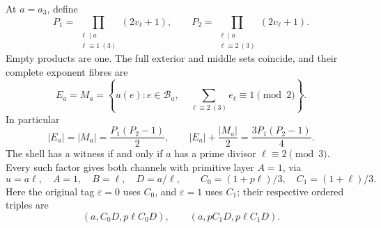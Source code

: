 \begin{theorem}
\label{thm:r3-factor-sieve}
At \(a=a_3\), define
\[
 P_1=\prod_{\substack{\ell\mid a\\\ell\equiv1\ (3)}}(2v_\ell+1),
 \qquad
 P_2=\prod_{\substack{\ell\mid a\\\ell\equiv2\ (3)}}(2v_\ell+1).
\]
Empty products are one. The full exterior and middle sets coincide,
and their complete exponent fibres are
\[
 E_a=M_a=
 \left\{u(e):e\in\mathcal B_a,\quad
           \sum_{\ell\equiv2\ (3)}e_\ell\equiv1\pmod2\right\}.
\]
In particular
\[
 |E_a|=|M_a|=\frac{P_1(P_2-1)}2,
 \qquad |E_a|+\frac{|M_a|}{2}=\frac{3P_1(P_2-1)}4.
\]
The shell has a witness if and only if \(a\) has a prime divisor
\(\ell\equiv2\pmod3\). Every such factor gives both channels
with primitive layer \(A=1\), via
\[
 u=a\ell,\quad A=1,\quad B=\ell,\quad D=a/\ell,
 \qquad C_0=(1+p\ell)/3,\quad C_1=(1+\ell)/3.
\]
Here the original tag \(\varepsilon=0\) uses \(C_0\), and
\(\varepsilon=1\) uses \(C_1\); their respective ordered triples are
\[
 (a,C_0D,p\ell C_0D),\qquad
 (a,pC_1D,p\ell C_1D).
\]
\end{theorem}
